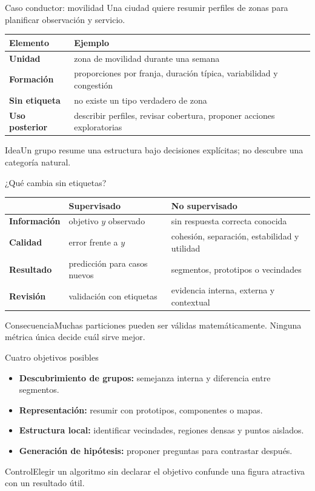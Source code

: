 \documentclass[aspectratio=169,10pt]{beamer}
\newcommand{\concepto}[1]{\textcolor{UAPTeal}{\textbf{#1}}}
\begin{document}
\begin{frame}{Caso conductor: movilidad}
  \small
  Una ciudad quiere resumir perfiles de zonas para planificar observación y servicio.
  \begin{tabularx}{\textwidth}{>{\bfseries}p{}X}\toprule
  Elemento & Ejemplo\\\midrule
  Unidad & zona de movilidad durante una semana\\
  Formación & proporciones por franja, duración típica, variabilidad y congestión\\
  Sin etiqueta & no existe un tipo verdadero de zona\\
  Uso posterior & describir perfiles, revisar cobertura, proponer acciones exploratorias\\\bottomrule
  \end{tabularx}
  \begin{block}{Idea}Un grupo resume una estructura bajo decisiones explícitas; no descubre una categoría natural.\end{block}
\end{frame}

\begin{frame}{¿Qué cambia sin etiquetas?}
  \small
  \begin{tabularx}{\textwidth}{>{\bfseries}p{}XX}\toprule
   & Supervisado & No supervisado\\\midrule
  Información & objetivo $y$ observado & sin respuesta correcta conocida\\
  Calidad & error frente a $y$ & cohesión, separación, estabilidad y utilidad\\
  Resultado & predicción para casos nuevos & segmentos, prototipos o vecindades\\
  Revisión & validación con etiquetas & evidencia interna, externa y contextual\\\bottomrule
  \end{tabularx}
  \begin{alertblock}{Consecuencia}Muchas particiones pueden ser válidas matemáticamente. Ninguna métrica única decide cuál sirve mejor.\end{alertblock}
\end{frame}

\begin{frame}{Cuatro objetivos posibles}
  \small
  \begin{itemize}
    \item \concepto{Descubrimiento de grupos:} semejanza interna y diferencia entre segmentos.
    \item \concepto{Representación:} resumir con prototipos, componentes o mapas.
    \item \concepto{Estructura local:} identificar vecindades, regiones densas y puntos aislados.
    \item \concepto{Generación de hipótesis:} proponer preguntas para contrastar después.
  \end{itemize}
  \begin{alertblock}{Control}Elegir un algoritmo sin declarar el objetivo confunde una figura atractiva con un resultado útil.\end{alertblock}
\end{frame}
\end{document}
